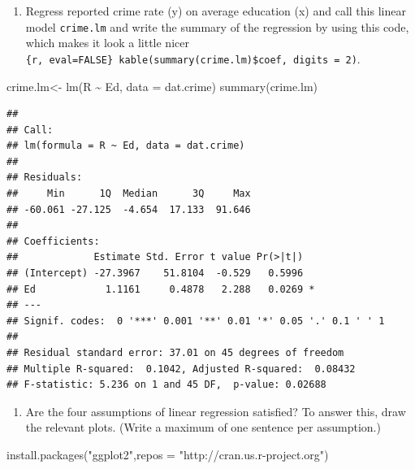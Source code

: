 \documentclass[
]{article}
\newenvironment{Shaded}{\begin{snugshade}}{\end{snugshade}}
\newcommand{\AttributeTok}[1]{\textcolor[rgb]{0.77,0.63,0.00}{#1}}
\newcommand{\FunctionTok}[1]{\textcolor[rgb]{0.00,0.00,0.00}{#1}}
\newcommand{\NormalTok}[1]{#1}
\newcommand{\OtherTok}[1]{\textcolor[rgb]{0.56,0.35,0.01}{#1}}
\newcommand{\SpecialCharTok}[1]{\textcolor[rgb]{0.00,0.00,0.00}{#1}}
\newcommand{\StringTok}[1]{\textcolor[rgb]{0.31,0.60,0.02}{#1}}
\providecommand{\tightlist}{%
  \setlength{\itemsep}{0pt}\setlength{\parskip}{0pt}}
\begin{document}
\begin{enumerate}
\def\labelenumi{\arabic{enumi}.}
\setcounter{enumi}{2}
\tightlist
\item
  Regress reported crime rate (y) on average education (x) and call this
  linear model \texttt{crime.lm} and write the summary of the regression
  by using this code, which makes it look a little nicer
  \texttt{\{r,\ eval=FALSE\}\ kable(summary(crime.lm)\$coef,\ digits\ =\ 2)}.
\end{enumerate}

\begin{Shaded}
\begin{Highlighting}[]
\NormalTok{crime.lm}\OtherTok{\textless{}{-}} \FunctionTok{lm}\NormalTok{(R }\SpecialCharTok{\textasciitilde{}}\NormalTok{ Ed, }\AttributeTok{data =}\NormalTok{ dat.crime)}
\FunctionTok{summary}\NormalTok{(crime.lm)}
\end{Highlighting}
\end{Shaded}

\begin{verbatim}
## 
## Call:
## lm(formula = R ~ Ed, data = dat.crime)
## 
## Residuals:
##     Min      1Q  Median      3Q     Max 
## -60.061 -27.125  -4.654  17.133  91.646 
## 
## Coefficients:
##             Estimate Std. Error t value Pr(>|t|)  
## (Intercept) -27.3967    51.8104  -0.529   0.5996  
## Ed            1.1161     0.4878   2.288   0.0269 *
## ---
## Signif. codes:  0 '***' 0.001 '**' 0.01 '*' 0.05 '.' 0.1 ' ' 1
## 
## Residual standard error: 37.01 on 45 degrees of freedom
## Multiple R-squared:  0.1042, Adjusted R-squared:  0.08432 
## F-statistic: 5.236 on 1 and 45 DF,  p-value: 0.02688
\end{verbatim}

\begin{enumerate}
\def\labelenumi{\arabic{enumi}.}
\setcounter{enumi}{3}
\tightlist
\item
  Are the four assumptions of linear regression satisfied? To answer
  this, draw the relevant plots. (Write a maximum of one sentence per
  assumption.)
\end{enumerate}

\begin{Shaded}
\begin{Highlighting}[]
\FunctionTok{install.packages}\NormalTok{(}\StringTok{"ggplot2"}\NormalTok{,}\AttributeTok{repos =} \StringTok{"http://cran.us.r{-}project.org"}\NormalTok{)}
\end{Highlighting}
\end{Shaded}
\end{document}
